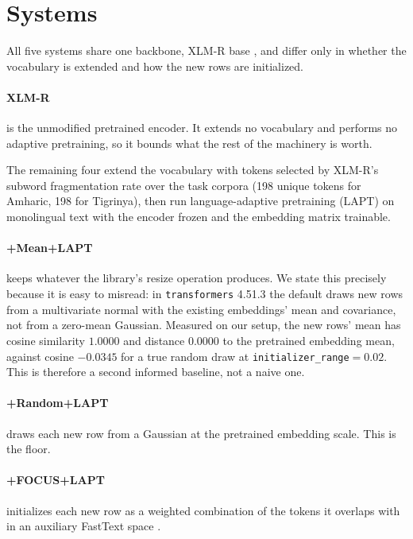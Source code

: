 \documentclass[11pt]{article}
\begin{document}
\section{Systems}
\label{sec:systems}

All five systems share one backbone, XLM-R base
\citep{conneau-etal-2020-unsupervised}, and differ only in whether the
vocabulary is extended and how the new rows are initialized.

\paragraph{XLM-R} is the unmodified pretrained encoder. It extends no
vocabulary and performs no adaptive pretraining, so it bounds what the rest
of the machinery is worth.

The remaining four extend the vocabulary with tokens selected by XLM-R's
subword fragmentation rate over the task corpora (198 unique tokens for
Amharic, 198 for Tigrinya), then run language-adaptive pretraining (LAPT) on
monolingual text with the encoder frozen and the embedding matrix trainable.

\paragraph{+Mean+LAPT} keeps whatever the library's resize operation
produces. We state this precisely because it is easy to misread: in
\texttt{transformers} 4.51.3 the default draws new rows from a multivariate
normal with the existing embeddings' mean and covariance, not from a
zero-mean Gaussian. Measured on our setup, the new rows' mean has cosine
similarity $1.0000$ and distance $0.0000$ to the pretrained embedding mean,
against cosine $-0.0345$ for a true random draw at
\texttt{initializer\_range}${=}0.02$. This is therefore a second informed
baseline, not a naive one.

\paragraph{+Random+LAPT} draws each new row from a Gaussian at the pretrained
embedding scale. This is the floor.

\paragraph{+FOCUS+LAPT} initializes each new row as a weighted combination of
the tokens it overlaps with in an auxiliary FastText space
\citep{dobler-de-melo-2023-focus}.
\end{document}
